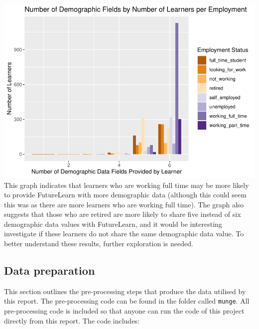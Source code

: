 \documentclass[
]{article}
\begin{document}
\includegraphics{CSC8631-Report---210431461_files/figure-latex/employment_demographic_declared-1.pdf}
This graph indicates that learners who are working full time may be more
likely to provide FutureLearn with more demographic data (although this
could seem this was as there are more learners who are working full
time). The graph also suggests that those who are retired are more
likely to share five instead of six demographic data values with
FutureLearn, and it would be interesting investigate if these learners
do not share the same demographic data value. To better understand these
results, further exploration is needed.

\hypertarget{data-preparation}{%
\subsection{Data preparation}\label{data-preparation}}

This section outlines the pre-processing steps that produce the data
utilised by this report. The pre-processing code can be found in the
folder called \texttt{munge}. All pre-processing code is included so
that anyone can run the code of this project directly from this report.
The code includes:
\end{document}
